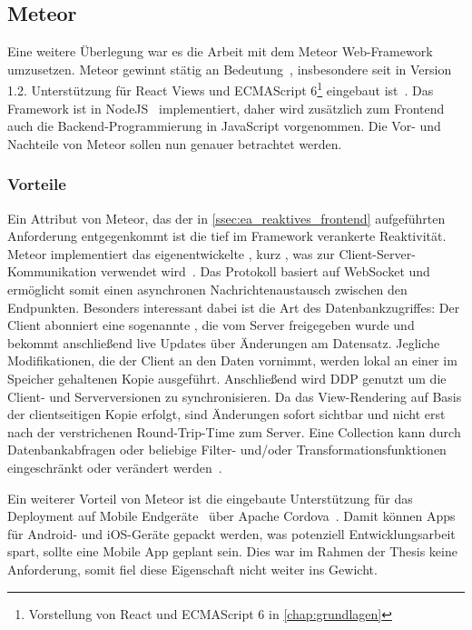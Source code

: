 \subsection{Meteor}
\label{ssec:el_meteor}

Eine weitere Überlegung war es die Arbeit mit dem Meteor Web-Framework
umzusetzen.  Meteor gewinnt stätig an Bedeutung~\cite{hotframeworks},
insbesondere seit in Version 1.2. Unterstützung für React Views und ECMAScript
6\footnote{Vorstellung von React und ECMAScript 6 in \cref{chap:grundlagen}}
eingebaut ist~\cite{meteor12}.  Das Framework ist in NodeJS~\cite{nodejs}
implementiert, daher wird zusätzlich zum Frontend auch die
Backend-Programmierung in JavaScript vorgenommen.  Die Vor- und Nachteile von
Meteor sollen nun genauer betrachtet werden.

\subsubsection{Vorteile}
\label{sssec:elm_vorteile}

Ein Attribut von Meteor, das der in \cref{ssec:ea_reaktives_frontend}
aufgeführten Anforderung entgegenkommt ist die tief im Framework verankerte
Reaktivität.  Meteor implementiert das eigenentwickelte
, kurz ,
was zur Client-Server-Kommunikation verwendet wird~\cite{ddp}.  Das Protokoll
basiert auf WebSocket und ermöglicht somit einen asynchronen
Nachrichtenaustausch zwischen den Endpunkten.  Besonders interessant dabei ist
die Art des Datenbankzugriffes:  Der Client abonniert eine sogenannte
, die vom Server freigegeben wurde und bekommt
anschließend live Updates über Änderungen am Datensatz.  Jegliche
Modifikationen, die der Client an den Daten vornimmt, werden lokal an einer im
Speicher gehaltenen Kopie ausgeführt.  Anschließend wird DDP genutzt um die
Client- und Serverversionen zu synchronisieren.  Da das View-Rendering auf
Basis der clientseitigen Kopie erfolgt, sind Änderungen sofort sichtbar und
nicht erst nach der verstrichenen Round-Trip-Time zum Server.  Eine Collection
kann durch Datenbankabfragen oder beliebige Filter- und/oder
Transformationsfunktionen eingeschränkt oder verändert werden~\cite{meteordoc}.

Ein weiterer Vorteil von Meteor ist die eingebaute Unterstützung für das
Deployment auf Mobile Endgeräte~\cite{meteormobile} über Apache
Cordova~\cite{cordova}.  Damit können Apps für Android- und iOS-Geräte gepackt
werden, was potenziell Entwicklungsarbeit spart, sollte eine Mobile App geplant
sein.  Dies war im Rahmen der Thesis keine Anforderung, somit fiel diese
Eigenschaft nicht weiter ins Gewicht.

